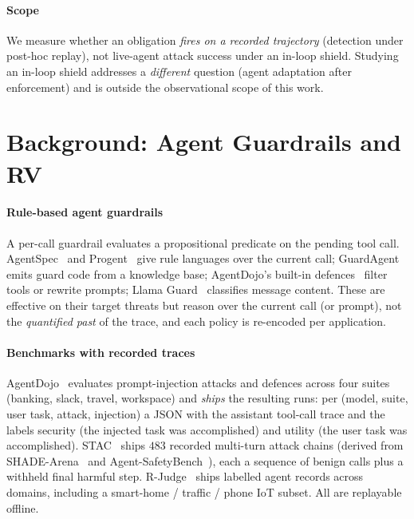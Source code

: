 \documentclass[sigconf]{acmart}
\begin{document}
\paragraph{Scope} We measure whether an obligation \emph{fires on a recorded
trajectory} (detection under post-hoc replay), not live-agent attack success under an
in-loop shield. Studying an in-loop shield addresses a \emph{different} question
(agent adaptation after enforcement) and is outside the observational scope of this
work.

\section{Background: Agent Guardrails and RV}
\label{sec:bg}

\paragraph{Rule-based agent guardrails} A per-call guardrail evaluates a
propositional predicate on the pending tool call. AgentSpec~\cite{agentspec2026}
and Progent~\cite{progent2025} give rule languages over the current call;
GuardAgent~\cite{guardagent2024} emits guard code from a knowledge base;
AgentDojo's built-in defences~\cite{agentdojo2024} filter tools or rewrite prompts;
Llama Guard~\cite{llamaguard2023} classifies message content. These are effective on
their target threats but reason over the current call (or prompt), not the
\emph{quantified past} of the trace, and each policy is re-encoded per application.

\paragraph{Benchmarks with recorded traces} AgentDojo~\cite{agentdojo2024}
evaluates prompt-injection attacks and defences across four suites (banking, slack,
travel, workspace) and \emph{ships} the resulting runs: per (model, suite, user
task, attack, injection) a JSON with the assistant tool-call trace and the labels
\textsf{security} (the injected task was accomplished) and \textsf{utility} (the
user task was accomplished). STAC~\cite{stac2026} ships $483$ recorded multi-turn
attack chains (derived from SHADE-Arena~\cite{shadearena2025} and
Agent-SafetyBench~\cite{agentsafetybench2024}), each a sequence of benign calls plus
a withheld final harmful step. R-Judge~\cite{rjudge2024} ships labelled agent
records across domains, including a smart-home / traffic / phone IoT subset. All are
replayable offline.
\end{document}
